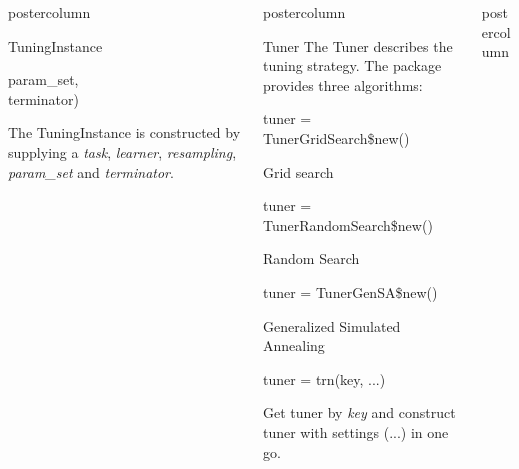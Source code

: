 \documentclass{beamer}
\newlength{\columnheight} %
\begin{document}
\begin{frame}[fragile]{}
\begin{columns}
\begin{column}{.245\textwidth}
\begin{beamercolorbox}[center]{postercolumn}
\begin{minipage}{.98\textwidth}
{\begin{myblock}{TuningInstance}
\begin{codeboxmultiline}[width=18cm]
							\hspace*{1ex}param\_set,\\
							\hspace*{1ex}terminator)
						\end{codeboxmultiline}
						The TuningInstance is constructed by supplying a \textit{task}, \textit{learner}, \textit{resampling}, \textit{param\_set} and \textit{terminator}. 
						\\
					\end{myblock}	
					\vfill}
				\end{minipage}
			\end{beamercolorbox}
		\end{column}
		\begin{column}{.245\textwidth}
			\begin{beamercolorbox}[center]{postercolumn}
				\begin{minipage}{.98\textwidth}
					\parbox[t][\columnheight]{\textwidth}{
						\begin{myblock}{Tuner}
							The Tuner describes the tuning strategy. The package provides three algorithms:
							\\
							\begin{codebox}
								tuner = TunerGridSearch\$new()
							\end{codebox}
							Grid search
							\\
							\begin{codebox}
								tuner = TunerRandomSearch\$new()
							\end{codebox}
							Random Search
							\\
							\begin{codebox}
								tuner = TunerGenSA\$new()
							\end{codebox}
							Generalized Simulated Annealing
							\\
							\begin{codebox}
								tuner = trn(key, ...)
							\end{codebox}
							Get tuner by \textit{key} and construct tuner with settings (...) in one go.
						\end{myblock}
					\vfill}
				\end{minipage}
			\end{beamercolorbox}
		\end{column}
		\begin{column}{.245\textwidth}
			\begin{beamercolorbox}[center]{postercolumn}
				\begin{minipage}{.98\textwidth}

\end{minipage}
\end{beamercolorbox}
\end{column}
\end{columns}
\end{frame}
\end{document}
